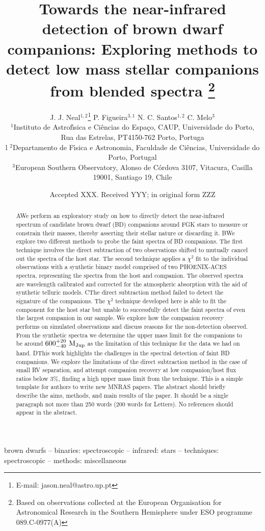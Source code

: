 \documentclass[fleqn,usenatbib]{mnras}
\title[Towards the nIR detection of BD companions]{Towards the near-infrared detection of brown dwarf companions: Exploring methods to detect low mass stellar companions from blended spectra \thanks{Based on observations collected at the European Organisation for Astronomical Research in the Southern Hemisphere under ESO programme 089.C-0977(A)}}
\author[J. J. Neal et al.]{
J. J. Neal$^{1,2}$\thanks{E-mail: jason.neal@astro.up.pt}
P. Figueira$^{3,1}$ 
N. C. Santos$^{1,2}$
C. Melo$^{3}$
\\
$^{1}$Instituto de Astrof\'{\i}sica e Ci\^encias do Espa\c{c}o, CAUP, Universidade do Porto, Rua das Estrelas, PT4150-762 Porto, Portuga\\l
$^{2}$Departamento de F\'{\i}sica e Astronomia, Faculdade de Ci\^{e}ncias, Universidade do Porto, Portugal\\
$^{3}$European Southern Observatory, Alonso de C\'{o}rdova 3107, Vitacura, Casilla 19001, Santiago 19, Chile\\
}
\date{Accepted XXX. Received YYY; in original form ZZZ}
\newcommand*\rd{\color{red}}
\begin{document}
\label{firstpage}
\pagerange{\pageref{firstpage}--\pageref{lastpage}}
\maketitle

\begin{abstract}
    {\rd A}We perform an exploratory study on how to directly detect the near-infrared spectrum of candidate brown dwarf (BD) companions around FGK stars to measure or constrain their masses, thereby asserting their stellar nature or discarding it. {\rd B}We explore two different methods to probe the faint spectra of BD companions. The first technique involves the direct subtraction of two observations shifted to mutually cancel out the spectra of the host star. The second technique applies a \(\chi^{2}\) fit to the individual observations with a synthetic binary model comprised of two PHOENIX-ACES spectra, representing the spectra from the host and companion. The observed spectra are wavelength calibrated and corrected for the atmospheric absorption with the aid of synthetic telluric models.
    {\rd C}The direct subtraction method failed to detect the signature of the companions. The \(\chi^{2}\) technique developed here is able to fit the component for the host star but unable to successfully detect the faint spectra of even the largest companion in our sample. We explore how the companion recovery performs on simulated observations and discuss reasons for the non-detection observed. From the synthetic spectra we determine the upper mass limit for the companions to be around \(\rm 600^{+20}_{-40}~M_{Jup}\) as the limitation of this technique for the data we had on hand. {\rd D}This work highlights the challenges in the spectral detection of faint BD companions. We explore the limitations of the direct subtraction method in the case of small RV separation, and attempt companion recovery at low companion/host flux ratios below 3\%, finding a high upper mass limit from the technique. {\rd This is a simple template for authors to write new MNRAS papers.
The abstract should briefly describe the aims, methods, and main results of the paper.
It should be a single paragraph not more than 250 words (200 words for Letters).
No references should appear in the abstract.}
\end{abstract}

\begin{keywords}
brown dwarfs -- binaries: spectroscopic -- infrared: stars -- techniques: spectroscopic -- methods: miscellaneous
\end{keywords}
\end{document}
